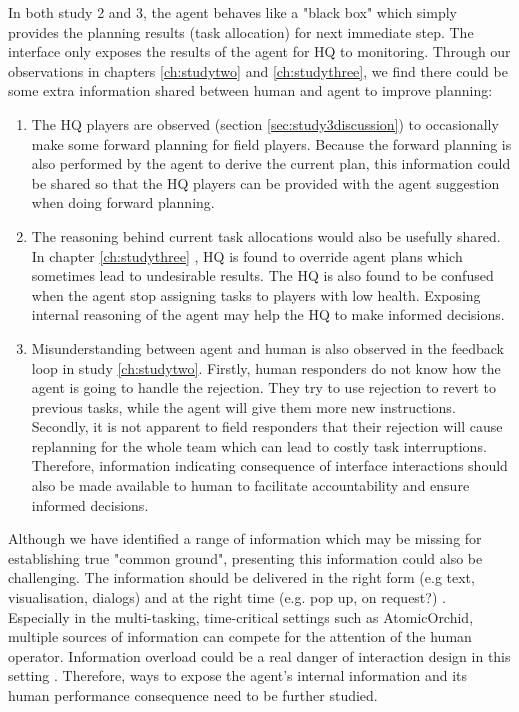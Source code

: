 In both study 2 and 3, the agent behaves like a "black box" which simply provides the planning results (task allocation) for next immediate step. The interface only exposes the results of the agent for HQ to monitoring. Through our observations in chapters \ref{ch:studytwo} and \ref{ch:studythree}, we find there could be some extra information shared between human and agent to improve planning:\\

\begin{enumerate}

\item The HQ players are observed (section \ref{sec:study3discussion}) to occasionally make some forward planning for field players. Because the forward planning is also performed by the agent to derive the current plan, this information could be shared so that the HQ players can be provided with the agent suggestion when doing forward planning.\\

\item The reasoning behind current task allocations would also be usefully shared. In chapter \ref{ch:studythree} , HQ is found to override agent plans which sometimes lead to undesirable results. The HQ is also found to be confused when the agent stop assigning tasks to players with low health. Exposing internal reasoning of the agent may help the HQ to make informed decisions. \\

\item Misunderstanding between agent and human is also observed in the feedback loop in study \ref{ch:studytwo}. Firstly, human responders do not know how the agent is going to handle the rejection. They try to use rejection to revert to previous tasks, while the agent will give them more new instructions. Secondly, it is not apparent to field responders that their rejection will cause replanning for the whole team which can lead to costly task interruptions. Therefore, information indicating consequence of interface interactions should also be made available to human to facilitate accountability and ensure informed decisions. \\

\end{enumerate}


Although we have identified a range of information which may be missing for establishing true "common ground", presenting this information could also be challenging. The information should be delivered in the right form (e.g text, visualisation, dialogs) and at the right time (e.g. pop up, on request?) \citep{Carver2007}. Especially in the multi-tasking, time-critical settings such as AtomicOrchid, multiple sources of information can compete for the attention of the human operator. Information overload could be a real danger of interaction design in this setting \citep{Lieberman2003}. Therefore, ways to expose the agent's internal information and its human performance consequence need to be further studied.   \\

